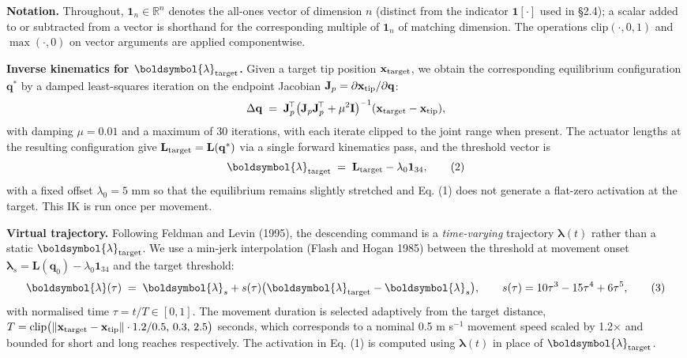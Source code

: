 \documentclass[
  11pt,
]{article}
\begin{document}
\textbf{Notation.} Throughout, \(\mathbf{1}_{n} \in \mathbb{R}^{n}\)
denotes the all-ones vector of dimension \(n\) (distinct from the
indicator \(\mathbf{1}[\cdot]\) used in §2.4); a scalar added to or
subtracted from a vector is shorthand for the corresponding multiple of
\(\mathbf{1}_{n}\) of matching dimension. The operations
\(\mathrm{clip}(\cdot, 0, 1)\) and \(\max(\cdot, 0)\) on vector
arguments are applied componentwise.

\textbf{Inverse kinematics for \(\boldsymbol{\lambda}_{\rm target}\).}
Given a target tip position \(\mathbf{x}_{\rm target}\), we obtain the
corresponding equilibrium configuration \(\mathbf{q}^{*}\) by a damped
least-squares iteration on the endpoint Jacobian
\(\mathbf{J}_p = \partial \mathbf{x}_{\rm tip}/\partial \mathbf{q}\): \[
\Delta\mathbf{q} \;=\; \mathbf{J}_p^{\!\top}\bigl(\mathbf{J}_p \mathbf{J}_p^{\!\top}+ \mu^2 \mathbf{I}\bigr)^{-1}(\mathbf{x}_{\rm target}-\mathbf{x}_{\rm tip}),
\] with damping \(\mu = 0.01\) and a maximum of 30 iterations, with each
iterate clipped to the joint range when present. The actuator lengths at
the resulting configuration give
\(\mathbf{L}_{\rm target} = \mathbf{L}(\mathbf{q}^{*})\) via a single
forward kinematics pass, and the threshold vector is \[
\boldsymbol{\lambda}_{\rm target} \;=\; \mathbf{L}_{\rm target} - \lambda_{0}\mathbf{1}_{34}, \tag{2}
\] with a fixed offset \(\lambda_{0} = 5\) mm so that the equilibrium
remains slightly stretched and Eq. (1) does not generate a flat-zero
activation at the target. This IK is run once per movement.

\textbf{Virtual trajectory.} Following Feldman and Levin (1995), the
descending command is a \emph{time-varying} trajectory
\(\boldsymbol{\lambda}(t)\) rather than a static
\(\boldsymbol{\lambda}_{\rm target}\). We use a min-jerk interpolation
(Flash and Hogan 1985) between the threshold at movement onset
\(\boldsymbol{\lambda}_{s} = \mathbf{L}(\mathbf{q}_{0}) - \lambda_{0}\mathbf{1}_{34}\)
and the target threshold: \[
\boldsymbol{\lambda}(\tau) \;=\; \boldsymbol{\lambda}_{s} + s(\tau)\bigl(\boldsymbol{\lambda}_{\rm target}-\boldsymbol{\lambda}_{s}\bigr),
\qquad s(\tau) = 10\tau^{3}-15\tau^{4}+6\tau^{5}, \tag{3}
\] with normalised time \(\tau = t/T \in [0,1]\). The movement duration
is selected adaptively from the target distance,
\(T = \mathrm{clip}\bigl(\|\mathbf{x}_{\rm target}-\mathbf{x}_{\rm tip}\|\cdot 1.2/0.5,\,0.3,\,2.5\bigr)\)
seconds, which corresponds to a nominal 0.5 m s\(^{-1}\) movement speed
scaled by 1.2× and bounded for short and long reaches respectively. The
activation in Eq. (1) is computed using \(\boldsymbol{\lambda}(t)\) in
place of \(\boldsymbol{\lambda}_{\rm target}\).
\end{document}
